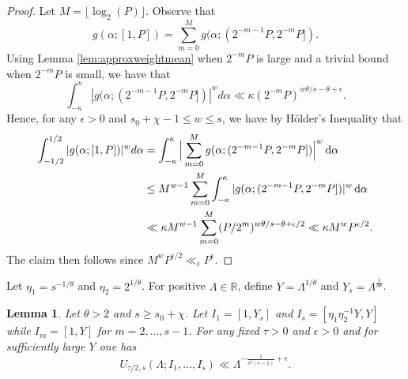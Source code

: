 \documentclass[11pt,reqno]{amsart}
\numberwithin{equation}{section}
\newtheorem{lemma}{Lemma}[section]
\renewcommand{\d}{\,{\rm d}}
\begin{document}
\begin{proof} 
Let $M = \lfloor \log_2(P)\rfloor$. Observe that 
\[ g(\alpha; [1,P]) = \sum_{m=0}^{M } g(\alpha; (2^{-m-1}P,2^{-m}P]). \] 
Using Lemma \ref{lem:approxweightmean} when $2^{-m}P$ is large and a trivial bound when $2^{-m}P$ is small, we have that 
\[ \int_{-\kappa}^{\kappa} |g(\alpha; (2^{-m-1}P,2^{-m}P])|^{w}d\alpha \ll \kappa(2^{-m}P)^{w\theta/s-\theta+\epsilon}. \]
Hence, for any $\epsilon >0$ and $s_0+\chi-1 \leq w \leq s$, we have by H\"{o}lder's Inequality that 
\begin{align*} \int_{-1/2}^{1/2} |g(\alpha;[1,P])|^{w}d\alpha & = \int_{-\kappa}^{\kappa} \Big|  \sum_{m=0}^{M } g(\alpha; (2^{-m-1}P,2^{-m}P]) \Big|^{w} \d\alpha  
\\ &\leq M^{w-1} \sum_{m=0}^{M} \int_{-\kappa}^{\kappa} |g(\alpha; (2^{-m-1}P,2^{-m}P])|^{w}\d\alpha 
\\ & \ll \kappa M^{w-1}\sum_{m=0}^{M} (P/2^{m})^{w\theta/s-\theta+\epsilon/2} \ll \kappa M^{w}P^{\epsilon/2}. 
\end{align*}
The claim then follows since $M^w P^{\epsilon/2} \ll_{\epsilon} P^{\epsilon}$. 
\end{proof}

Let $\eta_1 = s^{-1/\theta}$ and $\eta_2 = 2^{1/\theta}$. For positive $\Lambda \in \mathbb{R}$, define $Y = \Lambda^{1/\theta}$ and $Y_s = \Lambda^{\frac{1}{s\theta}}$.  

\begin{lemma} \label{lem:approxsmallmean}
Let $\theta > 2$ and $s \geq s_0+\chi$. Let $I_1 = [1, Y_s]$ and $I_s = [\eta_1\eta_2^{-1}Y,Y]$ while $I_m = [1,Y]$ for $m = 2,\ldots, s-1$. For any fixed $\tau > 0$ and $\epsilon > 0$ and for sufficiently large $Y$ one has 
\[ U_{\tau/2,s}(\Lambda; I_1,\ldots, I_s) \ll \Lambda^{-\frac{1}{s^2(s-1)}+\epsilon}. \]
\end{lemma}
\end{document}
